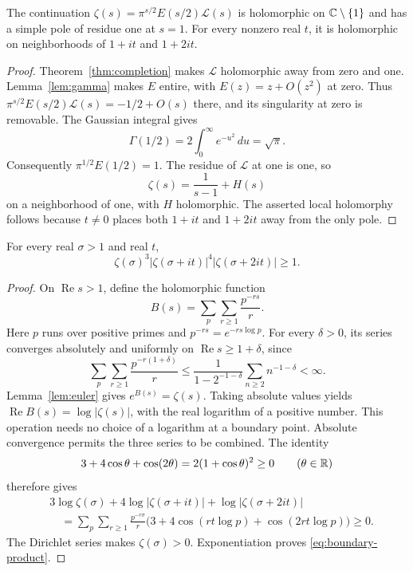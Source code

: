 \begin{lemma}
\label{lem:boundary-germs}
The continuation
$\zeta(s)=\pi^{s/2}E(s/2)\mathcal L(s)$ is holomorphic on
$\mathbb C\setminus\{1\}$ and has a simple pole of residue one at $s=1$.
For every nonzero real $t$, it is holomorphic on neighborhoods of
$1+it$ and $1+2it$.
\end{lemma}
\begin{proof}
Theorem~\ref{thm:completion} makes $\mathcal L$ holomorphic away from
zero and one.  Lemma~\ref{lem:gamma} makes $E$ entire, with
$E(z)=z+O(z^2)$ at zero.
Thus $\pi^{s/2}E(s/2)\mathcal L(s)=-1/2+O(s)$ there, and its
singularity at zero is removable.
The Gaussian integral gives
\[
 \Gamma(1/2)=2\int_0^\infty e^{-u^2}\,du=\sqrt\pi.
\]
Consequently $\pi^{1/2}E(1/2)=1$.
The residue of $\mathcal L$ at one is one, so
\begin{equation}
 \zeta(s)=\frac1{s-1}+H(s)
 \label{eq:boundary-pole}
\end{equation}
on a neighborhood of one, with $H$ holomorphic.
The asserted local holomorphy follows because $t\ne0$ places both
$1+it$ and $1+2it$ away from the only pole.
\end{proof}

\begin{lemma}
\label{lem:boundary-prime}
For every real $\sigma>1$ and real $t$,
\begin{equation}
 \zeta(\sigma)^3
 |\zeta(\sigma+it)|^4|\zeta(\sigma+2it)|\geq1.
 \label{eq:boundary-product}
\end{equation}
\end{lemma}
\begin{proof}
On $\operatorname{Re}s>1$, define the holomorphic function
\[
 B(s)=\sum_p\sum_{r\geq1}\frac{p^{-rs}}r.
\]
Here $p$ runs over positive primes and $p^{-rs}=e^{-rs\log p}$.
For every $\delta>0$, its series converges absolutely and uniformly on
$\operatorname{Re}s\geq1+\delta$, since
\[
 \sum_p\sum_{r\geq1}\frac{p^{-r(1+\delta)}}r
 \leq\frac1{1-2^{-1-\delta}}\sum_{n\geq2}n^{-1-\delta}<\infty.
\]
Lemma~\ref{lem:euler} gives $e^{B(s)}=\zeta(s)$.
Taking absolute values yields $\operatorname{Re}B(s)=\log|\zeta(s)|$,
with the real logarithm of a positive number.
This operation needs no choice of a logarithm at a boundary point.
Absolute convergence permits the three series to be combined.
The identity
\[
 3+4\cos\theta+\cos(2\theta)=2(1+\cos\theta)^2\geq0
 \qquad(\theta\in\mathbb R)
\]
therefore gives
\begin{align*}
 &3\log\zeta(\sigma)+4\log|\zeta(\sigma+it)|
                      +\log|\zeta(\sigma+2it)|\\
 &\quad=\sum_p\sum_{r\geq1}\frac{p^{-r\sigma}}r
       \bigl(3+4\cos(rt\log p)+\cos(2rt\log p)\bigr)\geq0.
\end{align*}
The Dirichlet series makes $\zeta(\sigma)>0$.
Exponentiation proves \eqref{eq:boundary-product}.
\end{proof}

